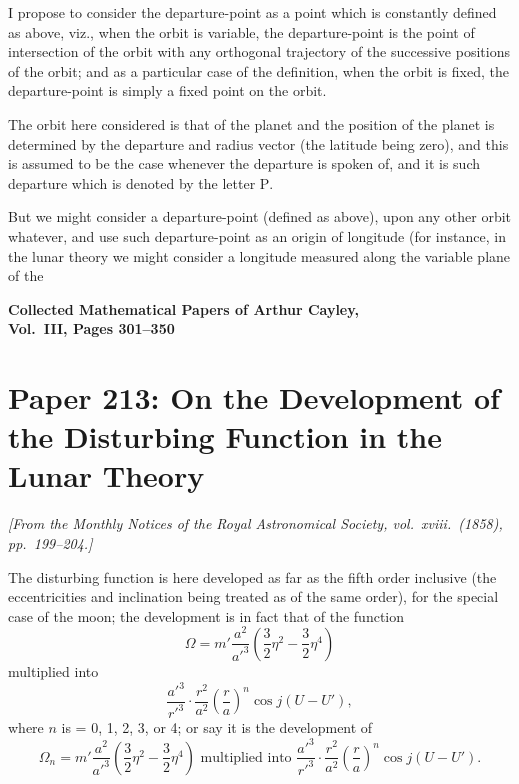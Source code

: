 \documentclass[11pt,a4paper]{book}
\begin{document}
{{I propose to consider the departure-point as a point which is constantly defined as above, viz., when the orbit is variable, the departure-point is the point of intersection of the orbit with any orthogonal trajectory of the successive positions of the orbit; and as a particular case of the definition, when the orbit is fixed, the departure-point is simply a fixed point on the orbit.

The orbit here considered is that of the planet and the position of the planet is determined by the departure and radius vector (the latitude being zero), and this is assumed to be the case whenever the departure is spoken of, and it is such departure which is denoted by the letter $\mathrm{P}$.

But we might consider a departure-point (defined as above), upon any other orbit whatever, and use such departure-point as an origin of longitude (for instance, in the lunar theory we might consider a longitude measured along the variable plane of the
\clearpage


\begin{center}
\Large\textbf{Collected Mathematical Papers of Arthur Cayley,\\Vol.~III, Pages 301--350}
\end{center}


\newpage

\section{Paper 213: On the Development of the Disturbing Function in the Lunar Theory}
\label{sec:paper213}

\noindent\textit{[From the \textit{Monthly Notices of the Royal Astronomical Society}, vol.~xviii.~(1858), pp.~199--204.]}

\medskip\noindent
The disturbing function is here developed as far as the fifth order inclusive (the eccentricities and inclination being treated as of the same order), for the special case of the moon; the development is in fact that of the function
\[
\Omega = m' \frac{a^2}{a'^3} \left(\frac{3}{2}\eta^2 - \frac{3}{2}\eta^4\right)
\]
multiplied into
\[
\frac{a'^3}{r'^3} \cdot \frac{r^2}{a^2} \left(\frac{r}{a}\right)^n \cos j(U - U'),
\]
where $n$ is = 0, 1, 2, 3, or 4; or say it is the development of
\[
\Omega_n = m' \frac{a^2}{a'^3} \left(\frac{3}{2}\eta^2 - \frac{3}{2}\eta^4\right) \text{ multiplied into } \frac{a'^3}{r'^3} \cdot \frac{r^2}{a^2} \left(\frac{r}{a}\right)^n \cos j(U - U').
\]

}}
\end{document}
